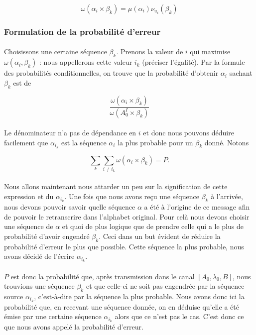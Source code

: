 	\[\omega(\alpha_i\times\beta_k)=\mu(\alpha_i)\nu_{u_i}(\beta_k)\]
	
\subsubsection*{Formulation de la probabilité d'erreur}
	
	\paragraph{}
	Choisissons une certaine séquence $\beta_k$.
	Prenons la valeur de $i$ qui maximise $\omega(\alpha_i,\beta_k)$ : nous 
	appellerons cette valeur $i_k$ (préciser l'égalité). Par la formule des
	probabilités conditionnelles, on trouve que la probabilité d'obtenir
	$\alpha_i$ sachant $\beta_k$ est de 
	
	\[\frac{\omega(\alpha_i \times \beta_k)}{\omega(A_0^I \times \beta_k)}\]
	
	\paragraph{}
	Le dénominateur n'a pas de dépendance en $i$ et donc nous pouvons déduire 
	facilement que $\alpha_{i_k}$ est la séquence $\alpha_i$ la plus probable 
	pour un $\beta_k$ donné. Notons
	
	\[\sum_k\sum_{i\neq i_k}\omega(\alpha_i \times \beta_k) = P.\]
	
	\paragraph{}
	Nous allons maintenant nous attarder un peu sur la signification de cette 
	expression et du $\alpha_{i_k}$. Une fois que nous avons reçu une séquence
	$\beta_k$ à l'arrivée, nous devons pouvoir savoir quelle séquence $\alpha$ 
	a été à l'origine de ce message afin de pouvoir le retranscrire dans 
	l'alphabet original. Pour celà nous devons choisir une séquence de $\alpha$
	et quoi de plus logique que de prendre celle qui a le plus de probabilité 
	d'avoir engendré $\beta_k$. Ceci dans un but évident de réduire la 
	probabilité d'erreur le plus que possible. Cette séquence la plus probable,
	nous avons décidé de l'écrire $\alpha_{i_k}$.
	
	\paragraph{}
	$P$ est donc la probabilité que, après transmission dans le canal 
	$[A_0,\lambda_0,B]$, nous trouvions une séquence $\beta_k$ et que
	celle-ci ne soit pas engendrée par la séquence source $\alpha_{i_k}$,
	c'est-à-dire par la séquence la plus probable. Nous avons donc ici la
	probabilité que, en recevant une séquence donnée, on en déduise
	qu'elle a été émise par une certaine séquence $\alpha_{i_k}$ alors
	que ce n'est pas le cas. C'est donc ce que nous avons appelé la 
	probabilité d'erreur.
	
